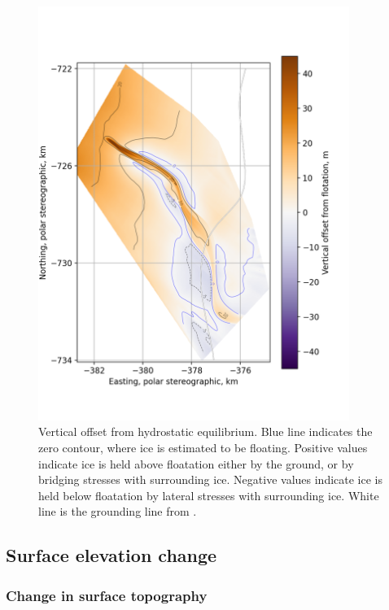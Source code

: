 \begin{figure}[!ht]
\centering
\includegraphics[width=0.9\textwidth]{chapters/2/where_float.png}
\caption[Hydrostatic Equilibrium]{Vertical offset from hydrostatic equilibrium. Blue line indicates the zero contour, where ice is estimated to be floating. Positive values indicate ice is held above floatation either by the ground, or by bridging stresses with surrounding ice. Negative values indicate ice is held below floatation by lateral stresses with surrounding ice.  White line is the grounding line from \cite{depoorter2013amii}. }
\label{fig:bridging}
\end{figure} 
\subsection{Surface elevation change } \label{sec:changeintopog}

\subsubsection{Change in surface topography} \label{sec:changeinsurf}


